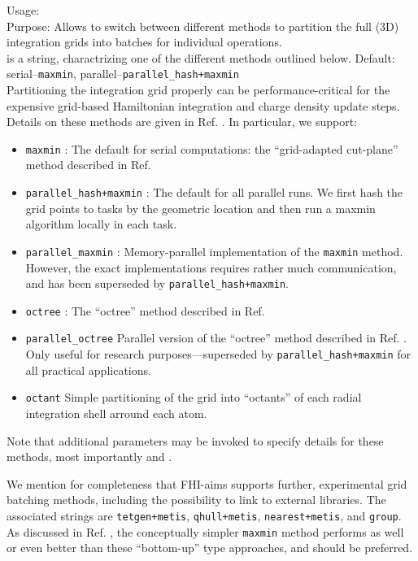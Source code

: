 {
  \noindent
  Usage:  
    \\[1.0ex]
  Purpose: Allows to switch between different methods to partition the
    full (3D) integration grids into batches for individual
    operations. \\[1.0ex]
   is a string, charactrizing one of the different
    methods outlined below. Default: serial--\texttt{maxmin},
    parallel--\texttt{parallel\_hash+maxmin} \\ 
}
Partitioning the integration grid properly can be performance-critical
for the expensive grid-based Hamiltonian integration and charge
density update steps. Details on these methods are given in
Ref. \cite{Havu08}. In particular, we support:
\begin{itemize}
  \item \texttt{maxmin} :
    The default for serial computations: the ``grid-adapted cut-plane'' method
    described in Ref. \cite{Havu08}
  \item \texttt{parallel\_hash+maxmin} :
    The default for all parallel runs. We first hash the grid points to tasks
    by the geometric location and then run a maxmin algorithm locally in each
    task. 
  \item \texttt{parallel\_maxmin} :
    Memory-parallel implementation of the \texttt{maxmin} method. However, the
    exact implementations requires rather much communication, and has been
    superseded by \texttt{parallel\_hash+maxmin}. 
  \item \texttt{octree} :
    The ``octree'' method described in Ref. \cite{Havu08}
  \item \texttt{parallel\_octree}
    Parallel version of the ``octree'' method described in
    Ref. \cite{Havu08}. Only useful for research purposes---superseded by
    \texttt{parallel\_hash+maxmin} for all practical applications. 
  \item \texttt{octant}
    Simple partitioning of the grid into ``octants'' of each radial
    integration shell arround each atom.
\end{itemize}
Note that additional parameters may be invoked to specify details for
these methods, most importantly  and
. 

We mention for completeness that FHI-aims supports further,
experimental grid batching methods, including the possibility to link
to external libraries. The associated  strings are
\texttt{tetgen+metis}, \texttt{qhull+metis}, \texttt{nearest+metis},
and \texttt{group}. As discussed in Ref. \cite{Havu08}, the
conceptually simpler \texttt{maxmin} method performs as well or even
better than these ``bottom-up'' type approaches, and should be
preferred. 

